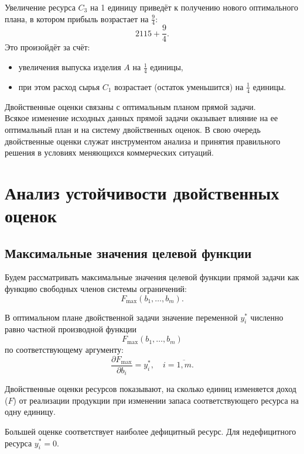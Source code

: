 \documentclass[17pt]{extarticle}
\begin{document}
Увеличение ресурса \( C_3 \) на 1 единицу приведёт к получению нового оптимального плана, в котором прибыль возрастает на \( \frac{9}{4} \):
\[
    2115 + \frac{9}{4}.
\]
Это произойдёт за счёт:
\begin{itemize}
    \item увеличения выпуска изделия \( A \) на \( \frac{1}{4} \) единицы,
    \item при этом расход сырья \( C_1 \) возрастает (остаток уменьшится) на \( \frac{1}{4} \) единицы.
\end{itemize}

Двойственные оценки связаны с оптимальным
планом прямой задачи. \\ Всякое изменение исходных
данных прямой задачи оказывает влияние на ее
оптимальный план и на систему двойственных
оценок.
В свою очередь двойственные оценки служат
инструментом анализа и принятия правильного
решения в условиях меняющихся коммерческих
ситуаций.


\section{Анализ устойчивости двойственных оценок}

\subsection{Максимальные значения целевой функции}
Будем рассматривать максимальные значения целевой функции прямой задачи как функцию свободных членов системы ограничений:
\[
    F_{\max} \left( b_1, \ldots, b_m \right).
\]
\begin{proposition}
    В оптимальном плане двойственной задачи значение переменной \( y_i^* \) численно равно частной производной функции
    \[
        F_{\max} \left( b_1, \ldots, b_m \right)
    \]
    по соответствующему аргументу:
    \[
        \frac{\partial F_{\max}}{\partial b_i} = y_i^*, \quad i = \overline{1, m}.
    \]

    Двойственные оценки ресурсов показывают,
    на сколько единиц изменяется доход (\( F \)) от реализации продукции при изменении запаса соответствующего ресурса на одну единицу.

    Большей оценке соответствует наиболее дефицитный ресурс. Для недефицитного ресурса \( y_i^* = 0 \).
\end{proposition}
\end{document}
